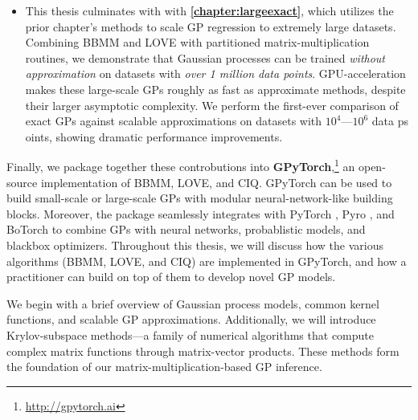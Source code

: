 \begin{itemize}
  \item This thesis culminates with with {\bf \cref{chapter:largeexact}}, which utilizes the prior chapter's methods to scale GP regression to extremely large datasets.
    Combining BBMM and LOVE with partitioned matrix-multiplication routines, we demonstrate that Gaussian processes can be trained \emph{without approximation} on datasets with \emph{over 1 million data points}.
    GPU-acceleration makes these large-scale GPs roughly as fast as approximate methods, despite their larger asymptotic complexity.
    We perform the first-ever comparison of exact GPs against scalable approximations on datasets with $10^4$---$10^6$ data ps oints, showing dramatic performance improvements.

\end{itemize}

\noindent
Finally, we package together these controbutions into {\bf GPyTorch},\footnote{
  \url{http://gpytorch.ai}
}
an open-source implementation of BBMM, LOVE, and CIQ.
GPyTorch can be used to build small-scale or large-scale GPs with modular neural-network-like building blocks.
Moreover, the package seamlessly integrates with PyTorch \cite{paszke2019pytorch}, Pyro \cite{bingham2019pyro}, and BoTorch \cite{balandat2019botorch} to combine GPs with neural networks, probablistic models, and blackbox optimizers.
Throughout this thesis, we will discuss how the various algorithms (BBMM, LOVE, and CIQ) are implemented in GPyTorch, and how a practitioner can build on top of them to develop novel GP models.

We begin with a brief overview of Gaussian process models, common kernel functions, and scalable GP approximations.
Additionally, we will introduce Krylov-subspace methods---a family of numerical algorithms that compute complex matrix functions through matrix-vector products.
These methods form the foundation of our matrix-multiplication-based GP inference.




